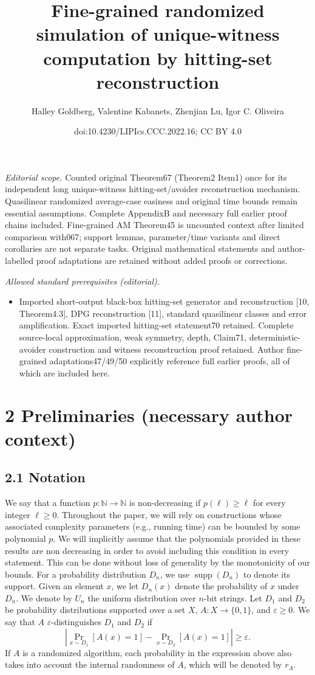\documentclass[10pt,a4paper]{article}
\title{Fine-grained randomized simulation of unique-witness computation by hitting-set reconstruction}
\author{Halley Goldberg, Valentine Kabanets, Zhenjian Lu, Igor C. Oliveira}
\date{doi:10.4230/LIPIcs.CCC.2022.16; CC BY 4.0}
\begin{document}
\maketitle
\noindent\textit{Editorial scope.} Counted original Theorem67 (Theorem2 Item1) once for its independent long unique-witness hitting-set/avoider reconstruction mechanism. Quasilinear randomized average-case easiness and original time bounds remain essential assumptions. Complete AppendixB and necessary full earlier proof chains included. Fine-grained AM Theorem45 is uncounted context after limited comparison with067; support lemmas, parameter/time variants and direct corollaries are not separate tasks. Original mathematical statements and author-labelled proof adaptations are retained without added proofs or corrections.\par\medskip
\noindent\textit{Allowed standard prerequisites (editorial).}\begin{itemize}
\item Imported short-output black-box hitting-set generator and reconstruction [10, Theorem4.3], DPG reconstruction [11], standard quasilinear classes and error amplification. Exact imported hitting-set statement70 retained. Complete source-local approximation, weak symmetry, depth, Claim71, deterministic-avoider construction and witness reconstruction proof retained. Author fine-grained adaptations47/49/50 explicitly reference full earlier proofs, all of which are included here.
\end{itemize}\medskip
\section*{2 Preliminaries (necessary author context)}
\subsection*{2.1 Notation}
We say that a function $p:\mathbb N\to\mathbb N$ is non-decreasing if $p(\ell)\geq\ell$ for every integer $\ell\geq0$. Throughout the paper, we will rely on constructions whose associated complexity parameters (e.g., running time) can be bounded by some polynomial $p$. We will implicitly assume that the polynomials provided in these results are non decreasing in order to avoid including this condition in every statement. This can be done without loss of generality by the monotonicity of our bounds.
For a probability distribution $D_n$, we use $\operatorname{supp}(D_n)$ to denote its support. Given an element $x$, we let $D_n(x)$ denote the probability of $x$ under $D_n$. We denote by $U_n$ the uniform distribution over $n$-bit strings.
Let $D_1$ and $D_2$ be probability distributions supported over a set $X$, $A:X\to\{0,1\}$, and $\varepsilon\geq0$. We say that $A$ $\varepsilon$-distinguishes $D_1$ and $D_2$ if
\[\left|\Pr_{x\sim D_1}[A(x)=1]-\Pr_{x\sim D_2}[A(x)=1]\right|\geq\varepsilon.\]
If $A$ is a randomized algorithm, each probability in the expression above also takes into account the internal randomness of $A$, which will be denoted by $r_A$.
\end{document}
